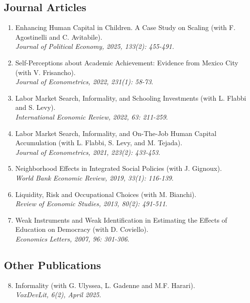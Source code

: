 \documentclass[12pt,english]{article}
\newcommand\reverselabel[1]{%
  \def\theenumi{}%
  \renewcommand\makelabel{\makebox[\dimexpr\labelwidth-3pt\relax][r]{%
    \the\numexpr#1-\value{enumi}+1\relax}}}%
\begin{document}
\subsection*{Journal Articles}
\begin{enumerate}
\reverselabel{7}
\item Enhancing Human Capital in Children. A Case Study on Scaling (with F. Agostinelli and C. Avitabile).\\ \textit{Journal of Political Economy, 2025, 133(2): 455-491.}
\item Self-Perceptions about Academic Achievement: Evidence from Mexico City (with V. Frisancho). \\
\textit{Journal of Econometrics, 2022, 231(1): 58-73}.  
\item  Labor Market Search, Informality, and Schooling Investments (with L. Flabbi and S. Levy). \\ \textit{International Economic Review, 2022, 63: 211-259}.  
\item  Labor Market Search, Informality, and On-The-Job Human Capital Accumulation (with L. Flabbi, S. Levy, and M. Tejada). \\ \textit{Journal of Econometrics, 2021, 223(2): 433-453}. 
\item Neighborhood Effects in Integrated Social Policies (with J. Gignoux). \\ \textit{World Bank Economic Review, 2019, 33(1): 116-139}.
\item Liquidity, Risk and Occupational Choices (with M. Bianchi). \\ \textit{Review of Economic Studies, 2013, 80(2): 491-511}.
\item Weak Instruments and Weak Identification in Estimating the Effects of Education on Democracy (with D. Coviello).\\ \textit{Economics Letters, 2007, 96: 301-306}.
\end{enumerate}


\subsection*{Other Publications}
\begin{enumerate}
\setcounter{enumi}{7}
\item Informality (with G. Ulyssea, L. Gadenne and M.F. Harari). \\
\textit{VoxDevLit, 6(2), April 2025}.
\end{enumerate}
\end{document}
